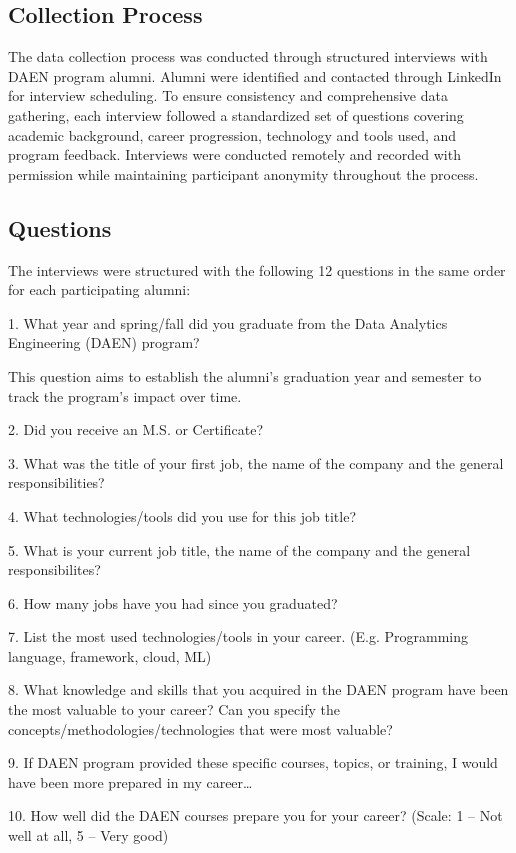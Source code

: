 \documentclass[12pt,a4paper]{article}
\begin{document}
\subsection{Collection Process}
The data collection process was conducted through structured interviews with DAEN program alumni. Alumni were identified and contacted through LinkedIn for interview scheduling. To ensure consistency and comprehensive data gathering, each interview followed a standardized set of questions covering academic background, career progression, technology and tools used, and program feedback. Interviews were conducted remotely and recorded with permission while maintaining participant anonymity throughout the process.

\subsection{Questions}
The interviews were structured with the following 12 questions in the same order for each participating alumni:

1. What year and spring/fall did you graduate from the Data Analytics Engineering (DAEN) program? 

This question aims to establish the alumni's graduation year and semester to track the program's impact over time.

2. Did you receive an M.S. or Certificate?  

3. What was the title of your first job, the name of the company and the general responsibilities?

4. What technologies/tools did you use for this job title? 

5. What is your current job title, the name of the company and the general responsibilites?  

6. How many jobs have you had since you graduated? 

7. List the most used technologies/tools in your career. (E.g. Programming language, framework, cloud, ML) 

8. What knowledge and skills that you acquired in the DAEN program have been the most valuable to your career? Can you specify the concepts/methodologies/technologies that were most valuable? 

9. If DAEN program provided these specific courses, topics, or training, I would have been more prepared in my career… 

10. How well did the DAEN courses prepare you for your career? (Scale: 1 – Not well at all, 5 – Very good) 
\end{document}
